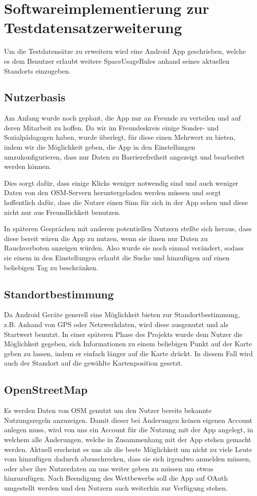 \section{Softwareimplementierung zur Testdatensatzerweiterung}
\label{sec:HelferApp}
Um die Testdatensätze zu erweitern wird eine Android App geschrieben, welche es dem
Benutzer erlaubt weitere SpaceUsageRules anhand seines aktuellen Standorts einzugeben.

\subsection{Nutzerbasis}
Am Anfang wurde noch geplant, die App nur an Freunde zu verteilen und auf deren Mitarbeit zu hoffen.
Da wir im Freundeskreis einige Sonder- und Sozialpädagogen haben, wurde überlegt, für diese einen Mehrwert zu bieten,
indem wir die Möglichkeit geben, die App in den Einstellungen umzukonfigurieren, dass nur Daten zu Barrierefreiheit 
angezeigt und bearbeitet werden können.

Dies sorgt dafür, dass einige Klicks weniger notwendig sind und auch weniger Daten von den OSM-Servern heruntergeladen werden müssen
und sorgt hoffentlich dafür, dass die Nutzer einen Sinn für sich in der App sehen und diese nicht nur aus Freundlichkeit benutzen.

In späteren Gesprächen mit anderen potentiellen Nutzern stellte sich heraus, dass diese bereit wären die App zu nutzen,
wenn sie ihnen nur Daten zu Rauchverboten anzeigen würden.
Also wurde sie noch einmal verändert, sodass sie einem in den Einstellungen erlaubt die Suche und hinzufügen auf einen beliebigen Tag zu beschränken.

\subsection{Standortbestimmung}
Da Android Geräte generell eine Möglichkeit bieten zur Standortbestimmung, z.B. Anhand von GPS oder Netzwerkdaten,
wird diese ausgenutzt und als Startwert benutzt.
In einer späteren Phase des Projekts wurde dem Nutzer die Möglichkeit gegeben, sich Informationen zu einem beliebigen Punkt auf der Karte geben zu lassen,
indem er einfach länger auf die Karte drückt. In diesem Fall wird auch der Standort auf die gewählte Kartenposition gesetzt.

\subsection{OpenStreetMap}
Es werden Daten von OSM genutzt um den Nutzer bereits bekannte Nutzungsregeln anzuzeigen.
Damit dieser bei Änderungen keinen eigenen Account anlegen muss, wird von uns ein Account für die Nutzung mit der App angelegt,
in welchem alle Änderungen, welche in Zusammenhang mit der App stehen gemacht werden.
Aktuell erscheint es uns als die beste Möglichkeit
um nicht zu viele Leute vom hinzufügen dadurch abzuschrecken, dass sie sich irgendwo anmelden müssen,
oder aber ihre Nutzerdaten an uns weiter geben zu müssen um etwas hinzuzufügen.
Nach Beendigung des Wettbewerbs soll die App auf OAuth umgestellt werden und den Nutzern auch weiterhin zur Verfügung stehen.

